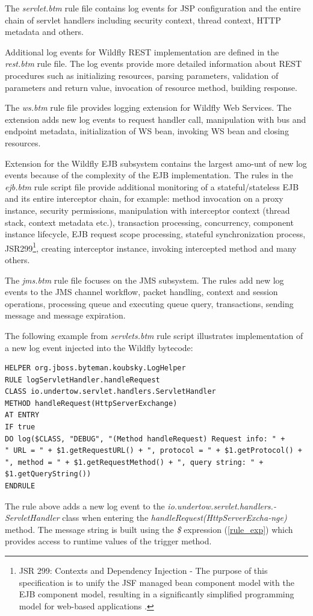 \documentclass[12pt,oneside]{fithesis2}
\begin{document}
The \textit{servlet.btm} rule file contains log events for JSP configuration and the entire chain of servlet handlers including security context, thread context, HTTP metadata and others.

Additional log events for Wildfly REST implementation are defined in the \textit{rest.btm} rule file. The log events provide more detailed information about REST procedures such as initializing resources, parsing parameters, validation of parameters and return value, invocation of resource method, building response.

The \textit{ws.btm} rule file provides logging extension for Wildfly Web Services. The extension adds new log events to request handler call, manipulation with bus and endpoint metadata, initialization of WS bean, invoking WS bean and closing resources.

Extension for the Wildfly EJB subsystem contains the largest amo-unt of new log events because of the complexity of the EJB implementation. The rules in the \textit{ejb.btm} rule script file provide additional monitoring of a stateful/stateless EJB and its entire interceptor chain, for example: method invocation on a proxy instance, security permissions, manipulation with interceptor context (thread stack, context metadata etc.), transaction processing, concurrency, component instance lifecycle, EJB request scope processing, stateful synchronization process, JSR299\footnote{JSR 299: Contexts and Dependency Injection - The purpose of this specification is to unify the JSF managed bean component model with the EJB component model, resulting in a significantly simplified programming model for web-based applications \cite{jsr299}.}, creating interceptor instance, invoking intercepted method and many others.

The \textit{jms.btm} rule file focuses on the JMS subsystem. The rules add new log events to the JMS channel workflow, packet handling, context and session operations, processing queue and executing queue query, transactions, sending message and message expiration.

The following example from \textit{servlets.btm} rule script illustrates implementation of a new log event injected into the Wildfly bytecode:
\newpage
\begin{lstlisting}[caption = An example of the rule implementation for a new log event, label = rule_log_example, style=byteman]
HELPER org.jboss.byteman.koubsky.LogHelper
RULE logServletHandler.handleRequest
CLASS io.undertow.servlet.handlers.ServletHandler
METHOD handleRequest(HttpServerExchange)
AT ENTRY
IF true
DO log($CLASS, "DEBUG", "(Method handleRequest) Request info: " + 
" URL = " + $1.getRequestURL() + ", protocol = " + $1.getProtocol() + 
", method = " + $1.getRequestMethod() + ", query string: " + $1.getQueryString())
ENDRULE
\end{lstlisting}
\noindent
The rule above adds a new log event to the \textit{io.undertow.servlet.handlers.-ServletHandler} class when entering the \textit{handleRequest(HttpServerExcha-nge)} method. The message string is built using the \textit{\$} expression (\ref{rule_exp}) which provides access to runtime values of the trigger method.
\end{document}
